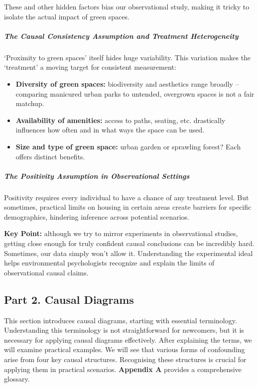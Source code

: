 \documentclass[
  singlecolumn]{article}
\let\oldsubparagraph\subparagraph
\renewcommand{\subparagraph}[1]{\oldsubparagraph{#1}\mbox{}}
\providecommand{\tightlist}{%
  \setlength{\itemsep}{0pt}\setlength{\parskip}{0pt}}\usepackage{longtable,booktabs,array}
\begin{document}
These and other hidden factors bias our observational study, making it
tricky to isolate the actual impact of green spaces.

\subparagraph{The Causal Consistency Assumption and Treatment
Heterogeneity}\label{the-causal-consistency-assumption-and-treatment-heterogeneity}

`Proximity to green spaces' itself hides huge variability. This
variation makes the `treatment' a moving target for consistent
measurement:

\begin{itemize}
\tightlist
\item
  \textbf{Diversity of green spaces:} biodiversity and aesthetics range
  broadly -- comparing manicured urban parks to untended, overgrown
  spaces is not a fair matchup.
\item
  \textbf{Availability of amenities:} access to paths, seating, etc.
  drastically influences how often and in what ways the space can be
  used.
\item
  \textbf{Size and type of green space:} urban garden or sprawling
  forest? Each offers distinct benefits.
\end{itemize}

\subparagraph{The Positivity Assumption in Observational
Settings}\label{the-positivity-assumption-in-observational-settings}

Positivity requires every individual to have a chance of any treatment
level. But sometimes, practical limits on housing in certain areas
create barriers for specific demographics, hindering inference across
potential scenarios.

\textbf{Key Point:} although we try to mirror experiments in
observational studies, getting close enough for truly confident causal
conclusions can be incredibly hard. Sometimes, our data simply won't
allow it. Understanding the experimental ideal helps environmental
psychologists recognize and explain the limits of observational causal
claims.

\subsection{Part 2. Causal Diagrams}\label{part-2.-causal-diagrams}

This section introduces causal diagrams, starting with essential
terminology. Understanding this terminology is not straightforward for
newcomers, but it is necessary for applying causal diagrams effectively.
After explaining the terms, we will examine practical examples. We will
see that various forms of confounding arise from four key causal
structures. Recognising these structures is crucial for applying them in
practical scenarios. \textbf{Appendix A} provides a comprehensive
glossary.
\end{document}
